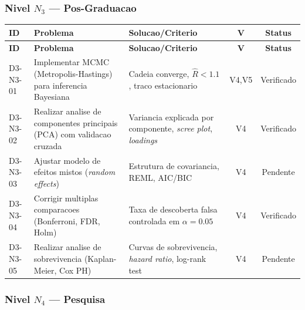 \subsubsection{Nivel $N_3$ --- Pos-Graduacao}

\begin{longtable}{|p{2.0cm}|p{4.2cm}|p{4.2cm}|c|c|}
\hline
\textbf{ID} & \textbf{Problema} & \textbf{Solucao/Criterio} & \textbf{V} & \textbf{Status} \\
\hline
\endfirsthead
\hline
\textbf{ID} & \textbf{Problema} & \textbf{Solucao/Criterio} & \textbf{V} & \textbf{Status} \\
\hline
\endhead
\hline
\endfoot
D3-N3-01 & Implementar MCMC (Metropolis-Hastings) para inferencia Bayesiana & Cadeia converge, $\hat{R}<1.1$, traco estacionario & V4,V5 & Verificado \\
\hline
D3-N3-02 & Realizar analise de componentes principais (PCA) com validacao cruzada & Variancia explicada por componente, \textit{scree plot}, \textit{loadings} & V4 & Verificado \\
\hline
D3-N3-03 & Ajustar modelo de efeitos mistos (\textit{random effects}) & Estrutura de covariancia, REML, AIC/BIC & V4 & Pendente \\
\hline
D3-N3-04 & Corrigir multiplas comparacoes (Bonferroni, FDR, Holm) & Taxa de descoberta falsa controlada em $\alpha=0.05$ & V4 & Verificado \\
\hline
D3-N3-05 & Realizar analise de sobrevivencia (Kaplan-Meier, Cox PH) & Curvas de sobrevivencia, \textit{hazard ratio}, log-rank test & V4 & Pendente \\
\hline
\end{longtable}

\subsubsection{Nivel $N_4$ --- Pesquisa}

